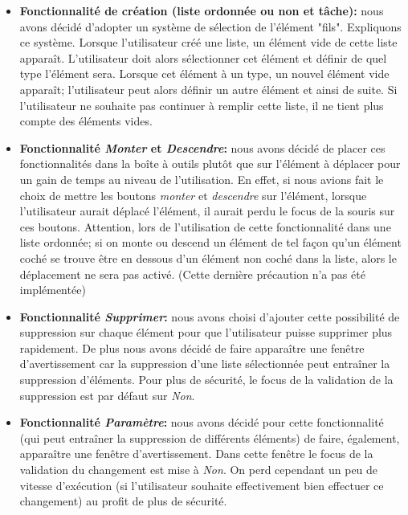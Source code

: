 \documentclass[a4paper,10pt]{article}
\begin{document}
\begin{itemize}
\item \textbf{Fonctionnalité de création (liste ordonnée ou non et tâche):} nous avons décidé d'adopter un système de sélection de l'élément "fils". Expliquons
ce système. Lorsque l'utilisateur créé une liste, un élément vide de cette liste apparaît. L'utilisateur doit alors sélectionner cet élément et définir de quel
type l'élément sera. Lorsque cet élément à un type, un nouvel élément vide apparaît; l'utilisateur peut alors définir un autre élément et ainsi de suite. Si
l'utilisateur ne souhaite pas continuer à remplir cette liste, il ne tient plus compte des éléments vides.
\item \textbf{Fonctionnalité \textit{Monter} et \textit{Descendre}:} nous avons décidé de placer ces fonctionnalités dans la boîte à outils plutôt que sur
l'élément à déplacer pour un gain de temps au niveau de l'utilisation. En effet, si nous avions fait le choix de mettre les boutons \textit{monter} et
\textit{descendre} sur l'élément, lorsque l'utilisateur aurait déplacé l'élément, il aurait perdu le focus de la souris sur ces boutons.
Attention, lors de l'utilisation de cette fonctionnalité dans une liste ordonnée; si on monte ou descend un élément de tel façon qu'un élément coché se trouve
être en dessous d'un élément non coché dans la liste, alors le déplacement ne sera pas activé. (Cette dernière précaution n'a pas été implémentée)
\item \textbf{Fonctionnalité \textit{Supprimer}:} nous avons choisi d'ajouter cette possibilité de suppression sur chaque élément pour que l'utilisateur puisse
supprimer plus rapidement. De  plus nous avons décidé de faire apparaître une fenêtre d'avertissement car la suppression d'une liste sélectionnée peut entraîner
la suppression d'éléments. Pour plus de sécurité, le focus de la validation de la suppression est par défaut sur \textit{Non}.
\item \textbf{Fonctionnalité \textit{Paramètre}:} nous avons décidé pour cette fonctionnalité (qui peut entraîner la suppression de différents éléments) de
faire, également, apparaître une fenêtre d'avertissement. Dans cette fenêtre le focus de la validation du changement est mise à \textit{Non}. On perd
cependant un peu de vitesse d'exécution (si l'utilisateur souhaite effectivement bien effectuer ce changement) au profit de plus de sécurité.
\end{itemize}
\end{document}
